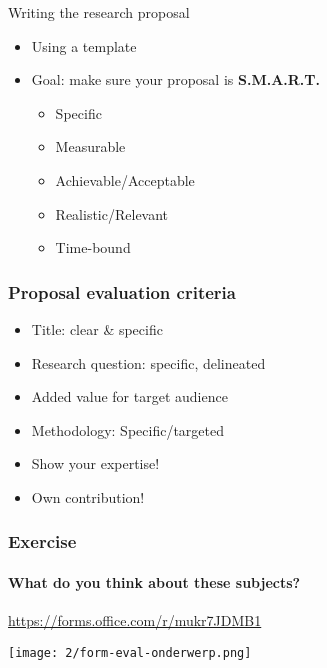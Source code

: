 \documentclass[aspectratio=169]{beamer}
\begin{document}
    \begin{frame}{Writing the research proposal}
        
        \begin{itemize}
            \item Using a template
            \item Goal: make sure your proposal is \textbf{S.M.A.R.T.}
            \begin{itemize}
                \item Specific
                \item Measurable
                \item Achievable/Acceptable
                \item Realistic/Relevant
                \item Time-bound
            \end{itemize}
        \end{itemize}
    \end{frame}
    
    \begin{frame}
        \frametitle{Proposal evaluation criteria}
        
        \begin{itemize}
            \item Title: clear \& specific
            \item Research question: specific, delineated
            \item Added value for target audience
            \item Methodology: Specific/targeted
            \item Show your expertise!
            \item Own contribution!
        \end{itemize}
        
    \end{frame}
    
    \begin{frame}
        \frametitle{Exercise}
        \framesubtitle{What do you think about these subjects?}
        
        \centering
        
        \url{https://forms.office.com/r/mukr7JDMB1}
        
        \bigskip
        
        \texttt{[image: 2/form-eval-onderwerp.png]}
        
    \end{frame}
    
\end{document}
